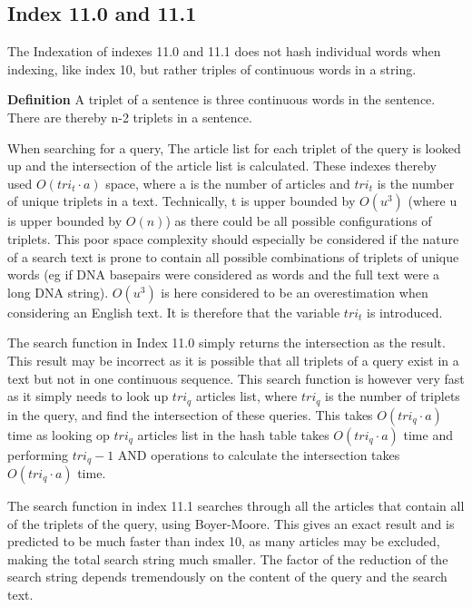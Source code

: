 \subsection{Index 11.0 and 11.1}
The Indexation of indexes 11.0 and 11.1 does not hash individual words when indexing, like index 10, but rather triples of continuous words in a string. 

\textbf{Definition} A triplet of a sentence is three continuous words in the sentence. There are thereby n-2 triplets in a sentence.

When searching for a query, The article list for each triplet of the query is looked up and the intersection of the article list is calculated. These indexes thereby used $O(tri_t\cdot a)$ space, where a is the number of articles and $tri_t$ is the number of unique triplets in a text. Technically, t is upper bounded by $O(u^3)$ (where u is upper bounded by $O(n)$) as there could be all possible configurations of triplets. This poor space complexity should especially be considered if the nature of a search text is prone to contain all possible combinations of triplets of unique words (eg if DNA basepairs were considered as words and the full text were a long DNA string).  $O(u^3)$ is here considered to be an overestimation when considering an English text. It is therefore that the variable $tri_t$ is introduced.

The search function in Index 11.0 simply returns the intersection as the result. This result may be incorrect as it is possible that all triplets of a query exist in a text but not in one continuous sequence. This search function is however very fast as it simply needs to look up $tri_q$ articles list, where $tri_q$ is the number of triplets in the query, and find the intersection of these queries. This takes $O(tri_q\cdot a)$ time as looking op $tri_q$ articles list in the hash table takes $O(tri_q\cdot a)$ time and performing $tri_q - 1 $ AND operations to calculate the intersection takes $O(tri_q\cdot a)$ time.

The search function in index 11.1 searches through all the articles that contain all of the triplets of the query, using Boyer-Moore. This gives an exact result and is predicted to be much faster than index 10, as many articles may be excluded, making the total search string much smaller. The factor of the reduction of the search string depends tremendously on the content of the query and the search text.